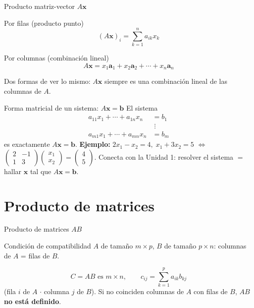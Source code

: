\documentclass[11pt]{beamer}
\newcommand{\vv}[1]{\mathbf{#1}}
\begin{document}
\begin{frame}{Producto matriz-vector \texorpdfstring{$A\vv{x}$}{Ax}}
  \begin{block}{Por filas (producto punto)}
    \[ (A\vv{x})_i = \sum_{k=1}^n a_{ik}x_k \]
  \end{block}
  \begin{alertblock}{Por columnas (combinación lineal)}
    \[ A\vv{x} = x_1\vv{a}_1 + x_2\vv{a}_2 + \cdots + x_n\vv{a}_n \]
  \end{alertblock}
  Dos formas de ver lo mismo: $A\vv{x}$ siempre es una combinación lineal de las columnas de $A$.
\end{frame}

\begin{frame}{Forma matricial de un sistema: \texorpdfstring{$A\vv{x}=\vv{b}$}{Ax=b}}
  El sistema
  \[
  \begin{aligned}
    a_{11}x_1+\cdots+a_{1n}x_n &= b_1 \\ &\;\vdots \\ a_{m1}x_1+\cdots+a_{mn}x_n &= b_m
  \end{aligned}
  \]
  es exactamente $A\vv{x}=\vv{b}$.
  \vfill
  \textbf{Ejemplo:} $2x_1-x_2=4,\;x_1+3x_2=5$
  $\Longleftrightarrow$
  $\begin{pmatrix}2&-1\\1&3\end{pmatrix}\begin{pmatrix}x_1\\x_2\end{pmatrix} = \begin{pmatrix}4\\5\end{pmatrix}$.
  \vfill
  \small Conecta con la Unidad 1: resolver el sistema $=$ hallar $\vv{x}$ tal que $A\vv{x}=\vv{b}$.
\end{frame}

\section{Producto de matrices}

\begin{frame}{Producto de matrices \texorpdfstring{$AB$}{AB}}
  \begin{alertblock}{Condición de compatibilidad}
    $A$ de tamaño $m\times p$, $B$ de tamaño $p\times n$: columnas de $A$ = filas de $B$.
  \end{alertblock}
  \[
    C=AB \text{ es } m\times n, \qquad c_{ij} = \sum_{k=1}^p a_{ik}b_{kj}
  \]
  (fila $i$ de $A$ $\cdot$ columna $j$ de $B$). Si no coinciden columnas de $A$ con filas de $B$,
  $AB$ \textbf{no está definido}.
\end{frame}
\end{document}
